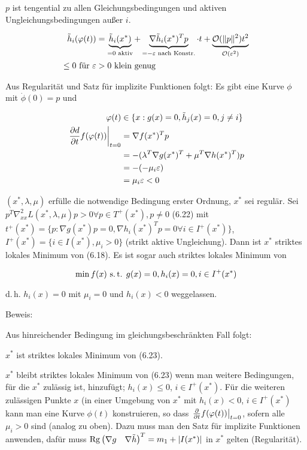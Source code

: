 $p$ ist tengential zu allen Gleichungsbedingungen und aktiven Ungleichungsbedingungen außer $i$.

\begin{align*}
\tilde h_i(\varphi(t)) &= \underbrace{\tilde h_i(x^*)}_{=0 \text{ aktiv}} + \underbrace{\nabla \tilde h_i (x^*)^T p}_{=-\varepsilon \text{ nach Konstr.}} \cdot t + \underbrace{\mathcal O(\|p\|^2) t^2}_{\mathcal O(\varepsilon^2)} \\
\leq 0 \text{ für } \varepsilon &> 0 \text{ klein genug}
\end{align*}

Aus Regularität und Satz für implizite Funktionen folgt: Es gibt eine Kurve $\phi$ mit $\dot \phi(0) = p$ und 

\begin{align*}
\varphi(t) &\in \{ x : g(x)=0, \tilde h_j(x) = 0, j\neq i \} \\
\left. \frac{\partial d}{\partial t} f(\varphi(t))\right|_{t=0} &= \nabla f(x^*)^T p\\
&= - ( \lambda^T \nabla g(x^*)^T + \mu^T \nabla h(x^*)^T)p \\
&= - (-\mu_i \varepsilon) \\
&= \mu_i\varepsilon < 0
\end{align*}


$(x^*, \lambda, \mu)$ erfülle die notwendige Bedingung erster Ordnung, $x^*$ sei regulär. Sei $p^T \nabla_{xx}^2 L(x^*, \lambda, \mu) p > 0 \forall p \in T^+(x^*), p\neq 0$ (6.22) mit $t^+(x^*) = \{ p: \nabla g(x^*) p = 0, \nabla h_i(x^*)^T p = 0 \forall i \in I^+(x^*) \}$, $I^+(x^*) = \{ i \in I(x^*), \mu_i > 0 \}$ (strikt aktive Ungleichung). Dann ist $x^*$ striktes lokales Minimum von (6.18). Es ist sogar auch striktes lokales Minimum von

\[ \min f(x) \text{ s.\,t. } g(x)=0, h_i(x) = 0, i \in I^+(x^*) \]

d.\,h. $h_i(x) = 0$ mit $\mu_i = 0$ und $h_i(x) < 0$ weggelassen.

Beweis:

Aus hinreichender Bedingung im gleichungsbeschränkten Fall folgt:

\bitm
\item $x^*$ ist striktes lokales Minimum von (6.23).
\item $x^*$ bleibt striktes lokales Minimum von (6.23) wenn man weitere Bedingungen, für die $x^*$ zulässig ist, hinzufügt; $h_i(x) \leq 0$, $i \in I^+(x^*)$. Für die weiteren zulässigen Punkte $x$ (in einer Umgebung von $x^*$ mit $h_i(x) < 0$, $i \in I^+(x^*)$ kann man eine Kurve $\phi(t)$ konstruieren, so dass $\left. \frac{\partial}{\partial t} f(\varphi(t))\right|_{t=0}$, sofern alle $\mu_i > 0$ sind (analog zu oben). Dazu muss man den Satz für implizite Funktionen anwenden, dafür muss $\mathrm{Rg} \begin{pmatrix} \nabla g & \nabla \tilde h \end{pmatrix}^T = m_1 + |I(x^*)|$ in $x^*$ gelten (Regularität).
\eitm

